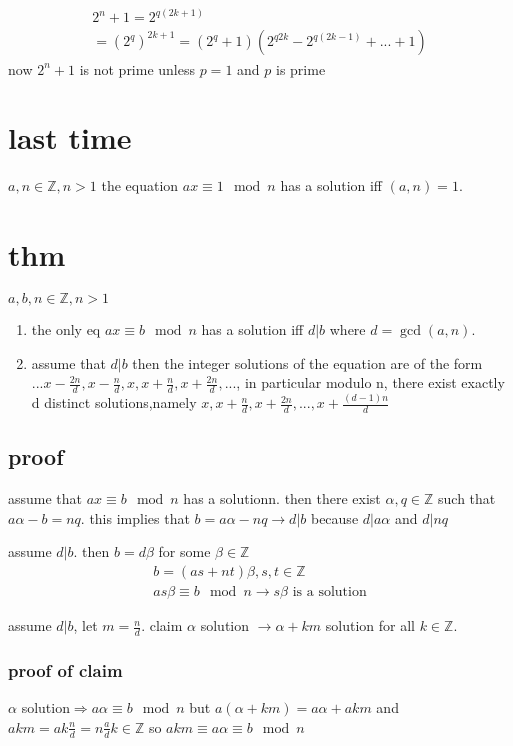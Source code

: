 \documentclass[letterpaper]{article}
\begin{document}
\begin{align*}
  2^n+1=2^{q(2k+1)}\\
  =(2^{q})^{2k+1}=(2^q+1)(2^{q2k}-2^{q(2k-1)}+...+1)
\end{align*}
now $2^n+1$ is not prime unless $p=1$ and $p$ is prime
\section*{last time}
$a,n\in\mathbb{Z}, n>1$ the equation $ax\equiv 1 \mod n$ has a solution iff $(a,n)=1$.

\section*{thm}
$a,b,n\in\mathbb{Z},n>1$
\begin{enumerate}
\item
the only eq $ax\equiv b\mod n$ has a solution iff $d|b$ where $d=\gcd(a,n)$.
\item
assume that $d|b$ then the integer solutions of the equation are of the form $...x-\frac{2n}{d},x-\frac{n}{d},x,x+\frac{n}{d},x+\frac{2n}{d},...$, in particular modulo n, there exist exactly d distinct solutions,namely $x,x+\frac{n}{d},x+\frac{2n}{d},...,x+\frac{(d-1)n}{d}$
\end{enumerate}
\subsection*{proof}
assume that $ax\equiv  b\mod n$ has a solutionn. then there exist $\alpha,q\in\mathbb{Z}$ such that $a\alpha-b=nq$. this implies that $b=a\alpha-nq\rightarrow d|b$ because $d|a\alpha$ and $d|nq$


assume $d|b$. then $b=d\beta$ for some $\beta\in\mathbb{Z}$
\begin{align*}
  b=(as+nt)\beta, s,t\in\mathbb{Z}\\
  as\beta\equiv b\mod n\rightarrow s\beta\text{ is a solution}
\end{align*}

assume $d|b$, let $m=\frac{n}{d}$. claim $\alpha$ solution $\rightarrow\alpha+km$ solution for all $k\in\mathbb{Z}$.
\subsubsection*{proof of claim}
$\alpha$ solution$\Rightarrow a\alpha\equiv b\mod n$ but $a(\alpha+km)=a\alpha+akm$ and $akm=ak\frac{n}{d}=n\frac{a}{d}k\in\mathbb{Z}$ so $akm\equiv a\alpha\equiv b \mod n$
\end{document}
